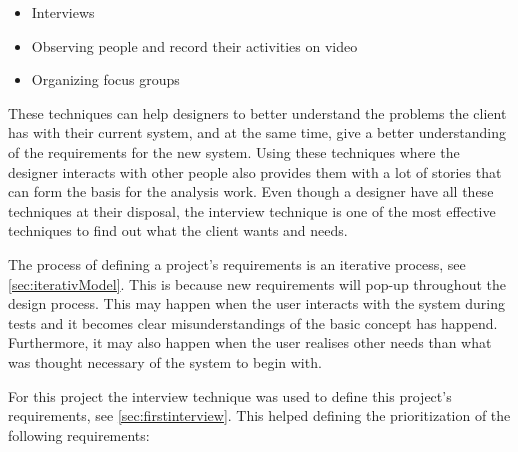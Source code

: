 \begin{itemize}
    \item Interviews
    \item Observing people and record their activities on video
    \item Organizing focus groups
\end{itemize}

These techniques can help designers to better understand the problems the client has with their current system, and at the same time, give a better understanding of the requirements for the new system.
Using these techniques where the designer interacts with other people also provides them with a lot of stories that can form the basis for the analysis work.
Even though a designer have all these techniques at their disposal, the interview technique
is one of the most effective techniques to find out what the client wants and needs.

The process of defining a project's requirements is an iterative process, see \cref{sec:iterativModel}.
This is because new requirements will pop-up throughout the design process.
This may happen when the user interacts with the system during tests and it becomes clear misunderstandings of the basic concept has happend.
Furthermore, it may also happen when the user realises other needs than what was thought necessary of the system to begin with.

For this project the interview technique was used to define this project's requirements, see {\color{red}\cref{sec:firstinterview}}. This helped defining the prioritization of the following requirements:

